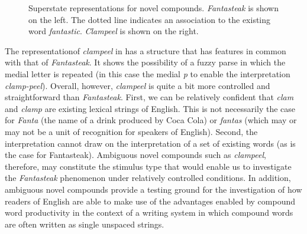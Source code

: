 \documentclass[output=paper]{langsci/langscibook}
\begin{document}
\begin{figure} 
    \centering
    \begin{minipage}{.5\linewidth}%
    \end{minipage}\begin{minipage}{.5\linewidth}%
    \end{minipage}
\caption{\label{fig:libben:3}Superstate representations for novel compounds. \textit{Fantasteak} is shown on the left.  The dotted line indicates an association to the existing word \textit{fantastic}.  \textit{Clampeel} is shown on the right.}
\end{figure}

The representation\largerpage[-1] of \textit{clampeel} in  has a structure that has features in common with that of \textit{Fantasteak}.  It shows the possibility of a fuzzy parse in which the medial letter is repeated (in this case the medial \textit{p} to enable the interpretation \textit{clamp-peel}).  Overall, however, \textit{clampeel} is quite a bit more controlled and straightforward than \textit{Fantasteak}. First, we can be relatively confident that \textit{clam} and \textit{clamp} are existing lexical strings of English. This is not necessarily the case for \textit{Fanta} (the name of a drink produced by Coca Cola) or \textit{fantas} (which may or may not be a unit of recognition for speakers of English). Second, the interpretation cannot draw on the interpretation of a set of existing words (as is the case for Fantasteak).  Ambiguous novel compounds such as \textit{clampeel}, therefore, may constitute the stimulus type that would enable us to investigate the \textit{Fantasteak} phenomenon under relatively controlled conditions. In addition, ambiguous novel compounds provide a testing ground for the investigation of how readers of English are able to make use of the advantages enabled by compound word productivity in the context of a writing system in which compound words are often written as single unspaced strings. 
\end{document}

